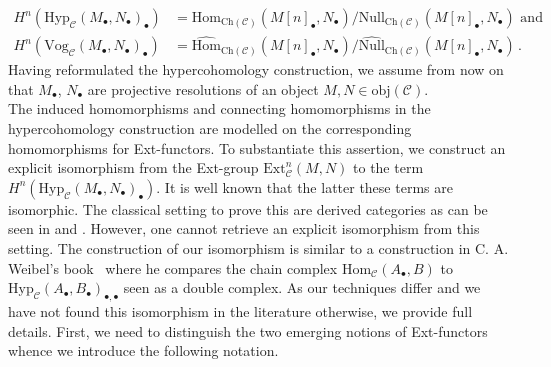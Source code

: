 \documentclass[12pt,a4paper]{article}
\numberwithin{equation}{section}
\theoremstyle{nonumberplain}
\begin{document}
\begin{align*}
H^n(\mathrm{Hyp}_{\mathcal{C}}(M_{\bullet}, N_{\bullet})_{\bullet}) &= \mathrm{Hom}_{\mathrm{Ch}(\mathcal{C})}(M[n]_{\bullet}, N_{\bullet})/ \mathrm{Null}_{\mathrm{Ch}(\mathcal{C})}(M[n]_{\bullet}, N_{\bullet}) \text{ and} \\
H^n(\mathrm{Vog}_{\mathcal{C}}(M_{\bullet}, N_{\bullet})_{\bullet}) &= \widehat{\mathrm{Hom}}_{\mathrm{Ch}(\mathcal{C})}(M[n]_{\bullet}, N_{\bullet})/ \widehat{\mathrm{Null}}_{\mathrm{Ch}(\mathcal{C})}(M[n]_{\bullet}, N_{\bullet}) \, .
\end{align*}
Having reformulated the hypercohomology construction, we assume from now on that $M_{\bullet}$, $N_{\bullet}$ are projective resolutions of an object $M, N \in \mathrm{obj}(\mathcal{C})$. \\

The induced homomorphisms and connecting homomorphisms in the hypercohomology construction are modelled on the corresponding homomorphisms for Ext-functors. To substantiate this assertion, we construct an explicit isomorphism from the Ext-group $\mathrm{Ext}_{\mathcal{C}}^n(M, N)$ to the term $H^n(\mathrm{Hyp}_{\mathcal{C}}(M_{\bullet}, N_{\bullet})_{\bullet})$. It is well known that the latter these terms are isomorphic. The classical setting to prove this are derived categories as can be seen in \cite[Chapter~III]{gel03} and \cite[Sections~2.4--2.5]{wei94}. However, one cannot retrieve an explicit isomorphism from this setting. The construction of our isomorphism is similar to a construction in C.\! A.\! Weibel's book~\cite[pp.~63--64]{wei94} where he compares the chain complex $\mathrm{Hom}_{\mathcal{C}}(A_{\bullet}, B)$ to $\mathrm{Hyp}_{\mathcal{C}}(A_{\bullet}, B_{\bullet})_{\bullet, \bullet}$ seen as a double complex. As our techniques differ and we have not found this isomorphism in the literature otherwise, we provide full details. First, we need to distinguish the two emerging notions of Ext-functors whence we introduce the following notation.
\end{document}
